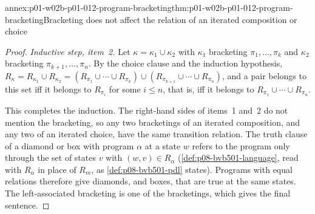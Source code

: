 \begin{annexitem}{annex:p01-w02b-p01-012-program-bracketing}{thm:p01-w02b-p01-012-program-bracketing}{Bracketing does not affect the relation of an iterated composition or choice}
\begin{proof}
\emph{Inductive step, item~2.}  Let \(\kappa=\kappa_1\cup\kappa_2\) with
\(\kappa_1\) bracketing \(\pi_1,\ldots,\pi_k\) and \(\kappa_2\) bracketing
\(\pi_{k+1},\ldots,\pi_n\).  By the choice clause and the induction
hypothesis,
\(R_\kappa=R_{\kappa_1}\cup R_{\kappa_2}
=(R_{\pi_1}\cup\cdots\cup R_{\pi_k})\cup(R_{\pi_{k+1}}\cup\cdots\cup R_{\pi_n})\),
and a pair belongs to this set iff it belongs to \(R_{\pi_i}\) for some
\(i\leq n\), that is, iff it belongs to
\(R_{\pi_1}\cup\cdots\cup R_{\pi_n}\).

This completes the induction.  The right-hand sides of items~1 and~2 do
not mention the bracketing, so any two bracketings of an iterated
composition, and any two of an iterated choice, have the same transition
relation.  The truth clause of a diamond or box with program \(\alpha\)
at a state \(w\) refers to the program only through the set of states
\(v\) with \((w,v)\in R_\alpha\) (\cref{def:p08-bvb501-language}, read with
\(R_\alpha\) in place of \(R_m\), as \cref{def:p08-bvb501-pdl} states).
Programs with equal relations therefore give diamonds, and boxes, that
are true at the same states.  The left-associated bracketing is one of
the bracketings, which gives the final sentence.
\end{proof}
\end{annexitem}

